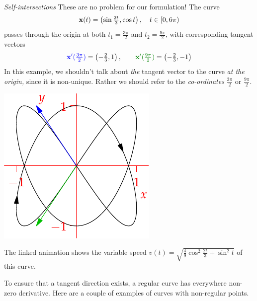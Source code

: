 \begin{tcolorbox}[exstyle,title={}]
\begin{description}
\begin{minipage}[t]{0.68\linewidth}\vspace{-10pt}
	\item[\normalfont\emph{Self-intersections}] These are no problem for our formulation!	The curve
	\[{\mathbf{x}}(t)=\left(\sin\tfrac{2t}3,\cos t\right),\quad t\in [0,6\pi)\]
 	passes through the origin at both $t_1=\frac{3\pi}2$ and $t_2=\frac{9\pi}2$, with corresponding tangent vectors
	\[\textcolor{blue}{\vx'(\tfrac{3\pi}2)}=\left(-\tfrac 23,1\right),\qquad \textcolor{Green}{\vx'(\tfrac{9\pi}2)}=\left(-\tfrac 23,-1\right)\]
	In this example, we shouldn't talk about \emph{the} tangent vector to the curve \emph{at the origin,} since it is non-unique. Rather we should refer to the \emph{co-ordinates} $\frac{3\pi}2$ or $\frac{9\pi}2$.
\end{minipage}\hfill\begin{minipage}[t]{0.31\linewidth}\vspace{0pt}
	\flushright\href{http://www.math.uci.edu/~ndonalds/math162a/curves-selfint.html}{\includegraphics[scale=0.95]{curves-selfint}}
\end{minipage}\par
The linked animation shows the variable speed $v(t)=\sqrt{\frac{4}{9}\cos^2\frac{2t}{3}+\sin^2t}$ of this curve.
\end{description}
\end{tcolorbox}

\goodbreak

 To ensure that a tangent direction exists, a regular curve has everywhere non-zero derivative. Here are a couple of examples of curves with non-regular points.

